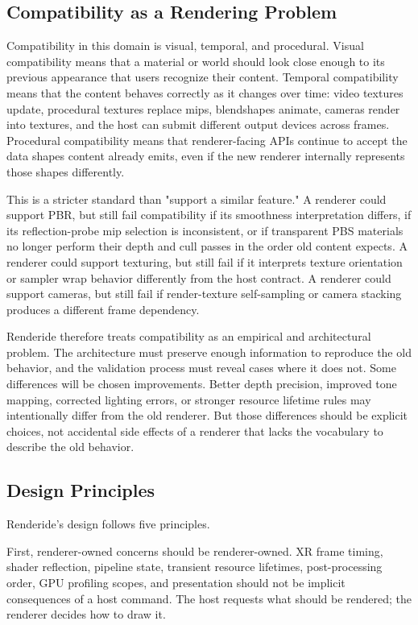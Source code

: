 \documentclass[acmtog,screen,nonacm]{acmart}
\begin{document}
\subsection{Compatibility as a Rendering Problem}

Compatibility in this domain is visual, temporal, and procedural. Visual compatibility means that a material or world should look close enough to its previous appearance that users recognize their content. Temporal compatibility means that the content behaves correctly as it changes over time: video textures update, procedural textures replace mips, blendshapes animate, cameras render into textures, and the host can submit different output devices across frames. Procedural compatibility means that renderer-facing APIs continue to accept the data shapes content already emits, even if the new renderer internally represents those shapes differently.

This is a stricter standard than "support a similar feature." A renderer could support PBR, but still fail compatibility if its smoothness interpretation differs, if its reflection-probe mip selection is inconsistent, or if transparent PBS materials no longer perform their depth and cull passes in the order old content expects. A renderer could support texturing, but still fail if it interprets texture orientation or sampler wrap behavior differently from the host contract. A renderer could support cameras, but still fail if render-texture self-sampling or camera stacking produces a different frame dependency.

Renderide therefore treats compatibility as an empirical and architectural problem. The architecture must preserve enough information to reproduce the old behavior, and the validation process must reveal cases where it does not. Some differences will be chosen improvements. Better depth precision, improved tone mapping, corrected lighting errors, or stronger resource lifetime rules may intentionally differ from the old renderer. But those differences should be explicit choices, not accidental side effects of a renderer that lacks the vocabulary to describe the old behavior.

\subsection{Design Principles}

Renderide's design follows five principles.

First, renderer-owned concerns should be renderer-owned. XR frame timing, shader reflection, pipeline state, transient resource lifetimes, post-processing order, GPU profiling scopes, and presentation should not be implicit consequences of a host command. The host requests what should be rendered; the renderer decides how to draw it.
\end{document}
